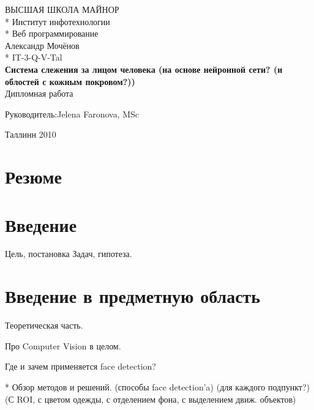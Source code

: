 \documentclass[12pt]{report}
\begin{document}

\begin{titlepage}
  \begin{center}
	\uppercase{Высшая школа майнор}\\*
	Институт инфотехнологии\\*
	Веб программирование\\[8cm]
	Александр Мочёнов\\*
	IT-3-Q-V-Tal\\[0.5cm]
	\large
	\textbf{Система слежения за лицом человека (на основе нейронной сети? (и облостей с кожным покровом?))}\\[1cm]
	\normalsize
	Дипломная работа\\[2cm]
	\begin{flushright}
		Руководитель:Jelena Faronova, MSc\\[7cm]
	\end{flushright}
	Таллинн 2010
  \end{center}
\end{titlepage}

\tableofcontents{\thispagestyle{fancyplain}}

\chapter*{Резюме}
\thispagestyle{fancy}



\chapter*{Введение}
\thispagestyle{fancy}

Цель, постановка Задач, гипотеза.

\chapter{Введение в предметную область}
\thispagestyle{fancy}

Теоретическая часть.

Про Computer Vision в целом.

Где и зачем применяется face detection?

* Обзор методов и решений. (способы face detection’a) (для каждого подпункт?) (С ROI, с цветом одежды, с отделением фона, с выделением движ. объектов)
\end{document}
